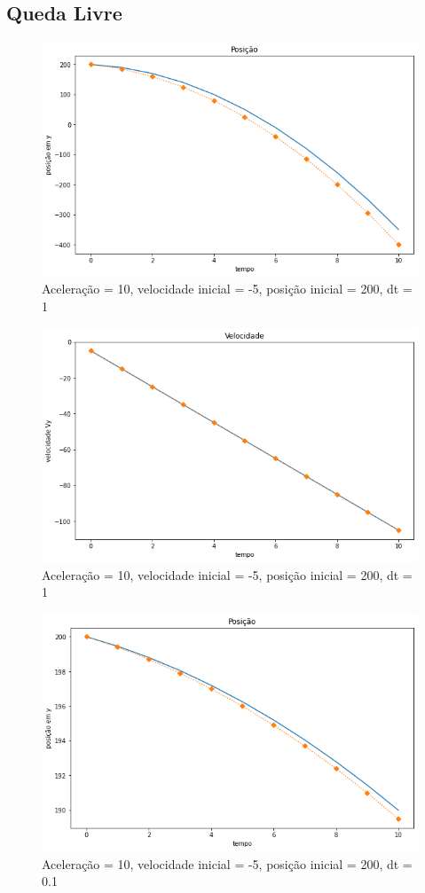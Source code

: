 \documentclass[12pt]{article}
\begin{document}
\subsection{Queda Livre}
\begin{figure}[H]
  \centering
  \includegraphics[scale = 0.6]{imagens/dt=1 tf=10 posicao em y.png}
  \caption{Aceleração = 10, velocidade inicial = -5, posição inicial = 200, dt = 1}
\end{figure}
\begin{figure}[H]
  \centering
  \includegraphics[scale = 0.6]{imagens/dt=1 tf=10 velocidade em y.png}
  \caption{Aceleração = 10, velocidade inicial = -5, posição inicial = 200, dt = 1}
\end{figure}
\begin{figure}[H]
  \centering
  \includegraphics[scale = 0.6]{imagens/dt=0.1 tf=1 posicao em y.png}
  \caption{Aceleração = 10, velocidade inicial = -5, posição inicial = 200, dt = 0.1}
\end{figure}
\end{document}
